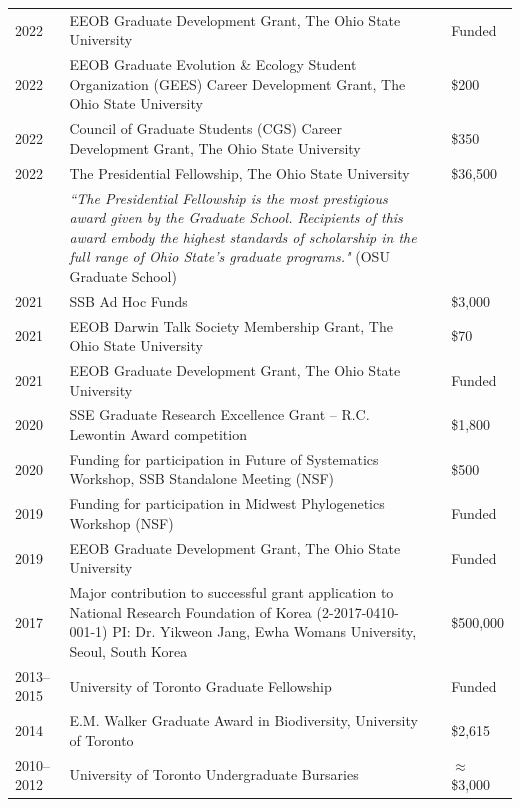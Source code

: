 \documentclass[11pt]{article}
\begin{document}
\begin{longtable}{p{}  p{} p{} p{} }%
2022 &	EEOB Graduate Development Grant, The Ohio State University	& & Funded\\
2022 &	EEOB Graduate Evolution \& Ecology Student Organization (GEES) Career Development Grant, The Ohio State University & & \$200\\
2022 & 	Council of Graduate Students (CGS) Career Development Grant, The Ohio State University & & \$350\\
2022 &	The Presidential Fellowship, The Ohio State University & & \$36,500\\
& \textit{``The Presidential Fellowship is the most prestigious award given by the Graduate School. Recipients of this award embody the highest standards of scholarship in the full range of Ohio State's graduate programs."} (OSU Graduate School) &&\\
2021 &	SSB Ad Hoc Funds	& & \$3,000\\
2021 &	EEOB Darwin Talk Society Membership Grant, The Ohio State University	& & \$70\\
2021 &	EEOB Graduate Development Grant, The Ohio State University	& & Funded\\
2020 &	SSE Graduate Research Excellence Grant – R.C. Lewontin Award competition	& & \$1,800 \\
2020 &	Funding for participation in Future of Systematics Workshop, SSB Standalone Meeting (NSF)	& & \$500\\
2019 &	Funding for participation in Midwest Phylogenetics Workshop (NSF)	& & Funded\\
2019 &	EEOB Graduate Development Grant, The Ohio State University	& & Funded\\
2017 &	Major contribution to successful grant application to 	National Research Foundation of Korea (2-2017-0410-001-1) PI: Dr. Yikweon Jang, Ewha Womans University, Seoul, South Korea	& & \ddag\$500,000\\
2013--2015 & University of Toronto Graduate Fellowship	& & Funded\\
2014 &	E.M. Walker Graduate Award in Biodiversity, University of Toronto	& & \dag\$2,615 \\
2010--2012 &	University of Toronto Undergraduate Bursaries	& & \dag$\approx$\$3,000 \\

\end{longtable}
\end{document}

